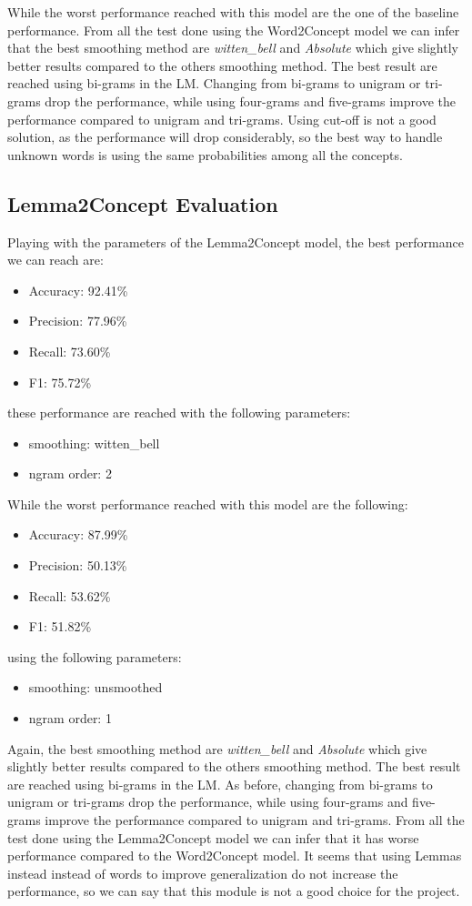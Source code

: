 \documentclass[11pt,a4paper]{article}
\begin{document}
While the worst performance reached with this model are the one of the baseline performance.
From all the test done using the Word2Concept model we can infer that the best smoothing method are \textit{witten\_bell} and \textit{Absolute} which give slightly better results compared to the others smoothing method. The best result are reached using bi-grams in the LM. Changing from bi-grams to unigram or tri-grams drop the performance, while using four-grams and five-grams improve the performance compared to unigram and tri-grams. Using cut-off is not a good solution, as the performance will drop considerably, so the best way to handle unknown words is using the same probabilities among all the concepts.
\subsection{Lemma2Concept Evaluation}
Playing with the parameters of the Lemma2Concept model, the best performance we can reach are:
\begin{itemize}
    \item Accuracy: 92.41\%
    \item Precision: 77.96\%
    \item Recall:   73.60\%
    \item F1:   75.72\%
\end{itemize}
these performance are reached with the following parameters:
\begin{itemize}
    \item smoothing: witten\_bell
    \item ngram order: 2
\end{itemize}

While the worst performance reached with this model are the following:
\begin{itemize}
    \item Accuracy: 87.99\%
    \item Precision: 50.13\%
    \item Recall:   53.62\%
    \item F1:   51.82\%
\end{itemize}
using the following parameters:
\begin{itemize}
    \item smoothing: unsmoothed
    \item ngram order: 1
\end{itemize}
Again, the best smoothing method are \textit{witten\_bell} and \textit{Absolute} which give slightly better results compared to the others smoothing method. The best result are reached using bi-grams in the LM. As before, changing from bi-grams to unigram or tri-grams drop the performance, while using four-grams and five-grams improve the performance compared to unigram and tri-grams.
From all the test done using the Lemma2Concept model we can infer that it has worse performance compared to the Word2Concept model. It seems that using Lemmas instead instead of words to improve generalization do not increase the performance, so we can say that this module is not a good choice for the project.
\end{document}
